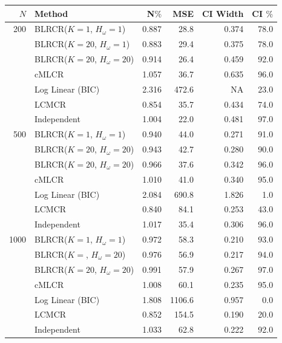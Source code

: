 \documentclass[
  12pt,
]{article}
\begin{document}
\singlespacing
\begin{table}[H]
\centering
\begin{tabular}{||r l r r r r||} 
 \hline
$N$ & Method & N$\%$ &MSE & CI Width & CI $\%$   \\ [0.5ex] 
 \hline\hline
 200    & BLRCR($K=1$, $H_\omega=1$)  & 0.887   & 28.8   & 0.374   & 78.0 \\ 
               & BLRCR($K=20$, $H_\omega=1$)    & 0.883     & 29.4     & 0.375     & 78.0 \\ 
               & BLRCR($K=20$, $H_\omega=20$)    & 0.914     & 26.4     & 0.459     & 92.0 \\  
               & cMLCR       & 1.057       & 36.7      & 0.635      & 96.0 \\
               & Log Linear (BIC)  & 2.316      & 472.6     & NA     & 23.0 \\ 
               & LCMCR       & 0.854       & 35.7      & 0.434      & 74.0 \\ 
               & Independent & 1.004 & 22.0& 0.481& 97.0 \\ 

\hline
500    & BLRCR($K=1$, $H_\omega=1$)  & 0.940   & 44.0   & 0.271   & 91.0 \\ 
               & BLRCR($K=20$, $H_\omega=20$)    & 0.943     & 42.7     & 0.280     & 90.0 \\ 
               & BLRCR($K=20$, $H_\omega=20$)    & 0.966     & 37.6     & 0.342     & 96.0 \\  
               & cMLCR       & 1.010       & 41.0      & 0.340      & 95.0 \\
               & Log Linear (BIC)  & 2.084      & 690.8     & 1.826     & 1.0 \\ 
               & LCMCR       & 0.840       & 84.1      & 0.253      & 43.0 \\ 
               & Independent & 1.017 & 35.4& 0.306& 96.0 \\ 



\hline
1000    & BLRCR($K=1$, $H_\omega=1$)  & 0.972   & 58.3   & 0.210   & 93.0 \\ 
               & BLRCR($K=$, $H_\omega=20$)    & 0.976     & 56.9     & 0.217     & 94.0 \\ 
               & BLRCR($K=20$, $H_\omega=20$)    & 0.991     & 57.9     & 0.267     & 97.0 \\  
               & cMLCR       & 1.008       & 60.1      & 0.235      & 95.0 \\
               & Log Linear (BIC)  & 1.808      & 1106.6     & 0.957     & 0.0 \\ 
               & LCMCR       & 0.852       & 154.5      & 0.190      & 20.0 \\ 
               & Independent & 1.033 & 62.8& 0.222& 92.0 \\ 



\end{tabular}
\end{table}
\end{document}
